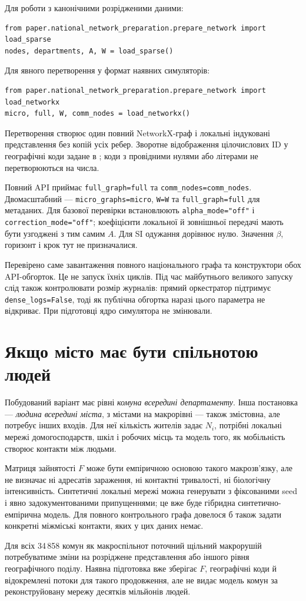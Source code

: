 \documentclass[11pt,a4paper]{article}
\begin{document}
Для роботи з канонічними розрідженими даними:
\begin{verbatim}
from paper.national_network_preparation.prepare_network import load_sparse
nodes, departments, A, W = load_sparse()
\end{verbatim}
Для явного перетворення у формат наявних симуляторів:
\begin{verbatim}
from paper.national_network_preparation.prepare_network import load_networkx
micro, full, W, comm_nodes = load_networkx()
\end{verbatim}
Перетворення створює один повний NetworkX-граф і локальні індуковані представлення без копій усіх ребер. Зворотне відображення цілочислових ID у географічні коди задане в ; коди з провідними нулями або літерами не перетворюються на числа.

Повний API приймає \texttt{full\_graph=full} та \texttt{comm\_nodes=comm\_nodes}. Двомасштабний --- \texttt{micro\_graphs=micro}, \texttt{W=W} та \texttt{full\_graph=full} для метаданих. Для базової перевірки встановлюють \texttt{alpha\_mode="off"} і \texttt{correction\_mode="off"}; коефіцієнти локальної й зовнішньої передачі мають бути узгоджені з тим самим $A$. Для SI одужання дорівнює нулю. Значення $\beta$, горизонт і крок тут не призначалися.

Перевірено саме завантаження повного національного графа та конструктори обох API-обгорток. Це не запуск їхніх циклів. Під час майбутнього великого запуску слід також контролювати розмір журналів: прямий оркестратор підтримує \texttt{dense\_logs=False}, тоді як публічна обгортка наразі цього параметра не відкриває. При підготовці ядро симулятора не змінювали.

\section{Якщо місто має бути спільнотою людей}
Побудований варіант має рівні \emph{комуна всередині департаменту}. Інша постановка --- \emph{людина всередині міста}, з містами на макрорівні --- також змістовна, але потребує інших входів. Для неї кількість жителів задає $N_i$, потрібні локальні мережі домогосподарств, шкіл і робочих місць та модель того, як мобільність створює контакти між людьми.

Матриця зайнятості $F$ може бути емпіричною основою такого макрозв'язку, але не визначає ні адресатів зараження, ні контактні тривалості, ні біологічну інтенсивність. Синтетичні локальні мережі можна генерувати з фіксованими seed і явно задокументованими припущеннями; це вже буде гібридна синтетично-емпірична модель. Для повного контрольного графа довелося б також задати конкретні міжміські контакти, яких у цих даних немає.

Для всіх 34\,858 комун як макроспільнот поточний щільний макрорушій потребуватиме зміни на розріджене представлення або іншого рівня географічного поділу. Наявна підготовка вже зберігає $F$, географічні коди й відокремлені потоки для такого продовження, але не видає модель комун за реконструйовану мережу десятків мільйонів людей.
\end{document}
